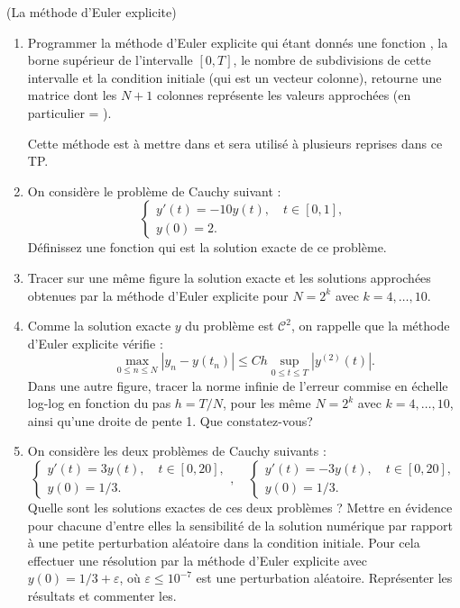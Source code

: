 \documentclass[a4paper,12pt,reqno]{amsart}
\begin{document}
\begin{exo} (La méthode d'Euler explicite)
  \begin{enumerate}\label{ex:euler}

    \item Programmer la méthode d'Euler explicite  qui étant donnés une fonction , la borne supérieur  de l'intervalle $[0,T]$, le nombre de subdivisions  de cette intervalle et la condition initiale  (qui est un vecteur colonne), retourne une matrice  dont les $N+1$ colonnes représente les valeurs approchées (en particulier  = ).

    Cette méthode est à mettre dans  et sera utilisé à plusieurs reprises dans ce TP.

    \item On considère le problème de Cauchy suivant :
      $$
        \begin{cases}
          y'(t)=-10y(t), \quad t \in [0,1], \\
          y(0)=2.
        \end{cases}
      $$
    Définissez une fonction  qui est la solution exacte de ce problème.

    \item Tracer sur une même figure la solution exacte et les solutions approchées obtenues par la méthode d'Euler explicite pour $N=2^{k}$ avec $k=4,\dots,10$.

    \item\label{q:oceuler} Comme la solution exacte $y$ du problème est ${\mathcal{C}}^{2}$, on rappelle que la méthode d'Euler explicite vérifie :
    $$
      \max_{0 \leq n \leq N} |y_n-y(t_n)|\leq C h \sup_{0 \leq t \leq T} |y^{(2)}(t)|.
    $$
    Dans une autre figure, tracer la norme infinie de l'erreur commise en échelle \og{}log-log\fg{} en fonction du pas $h=T/N$, pour les même $N=2^{k}$ avec $k=4,\dots,10$, ainsi qu'une droite de pente 1.
    Que constatez-vous?
    \item
    On considère les deux problèmes de Cauchy suivants :
    $$
      \begin{cases}
        y'(t)=3y(t), \quad t \in [0,20], \\
        y(0)=1/3.
      \end{cases}
      , \quad
      \begin{cases}
        y'(t)=-3y(t), \quad t \in [0,20], \\
        y(0)=1/3.
      \end{cases}
    $$
    Quelle sont les solutions exactes de ces deux problèmes ? Mettre en évidence  pour chacune d'entre elles la sensibilité de la solution numérique par rapport à une petite perturbation aléatoire dans la condition initiale. Pour cela effectuer une résolution par la méthode d'Euler explicite avec $y(0)= 1/3 + \varepsilon$, où $\varepsilon \leq 10^{-7}$ est une perturbation aléatoire. Représenter les résultats et commenter les.
  \end{enumerate}
\end{exo}
\end{document}
